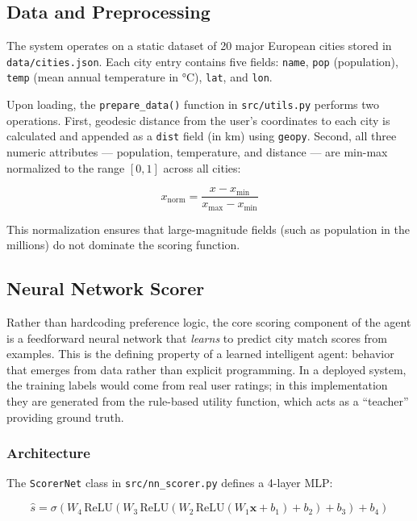 \documentclass[12pt]{article}
\begin{document}
\subsection{Data and Preprocessing}
The system operates on a static dataset of 20 major European cities stored in \texttt{data/cities.json}. Each city entry contains five fields: \texttt{name}, \texttt{pop} (population), \texttt{temp} (mean annual temperature in °C), \texttt{lat}, and \texttt{lon}.

Upon loading, the \texttt{prepare\_data()} function in \texttt{src/utils.py} performs two operations. First, geodesic distance from the user's coordinates to each city is calculated and appended as a \texttt{dist} field (in km) using \texttt{geopy}. Second, all three numeric attributes — population, temperature, and distance — are min-max normalized to the range $[0, 1]$ across all cities:

\begin{equation}
    x_{\text{norm}} = \frac{x - x_{\min}}{x_{\max} - x_{\min}}
\end{equation}

This normalization ensures that large-magnitude fields (such as population in the millions) do not dominate the scoring function.

\subsection{Neural Network Scorer}
\label{sec:nn}

Rather than hardcoding preference logic, the core scoring component of the agent is a feedforward neural network that \textit{learns} to predict city match scores from examples. This is the defining property of a learned intelligent agent: behavior that emerges from data rather than explicit programming. In a deployed system, the training labels would come from real user ratings; in this implementation they are generated from the rule-based utility function, which acts as a ``teacher'' providing ground truth.

\subsubsection{Architecture}

The \texttt{ScorerNet} class in \texttt{src/nn\_scorer.py} defines a 4-layer MLP:

\begin{equation}
    \hat{s} = \sigma\!\left(W_4\,\mathrm{ReLU}\!\left(W_3\,\mathrm{ReLU}\!\left(W_2\,\mathrm{ReLU}(W_1\mathbf{x} + b_1) + b_2\right) + b_3\right) + b_4\right)
\end{equation}
\end{document}
